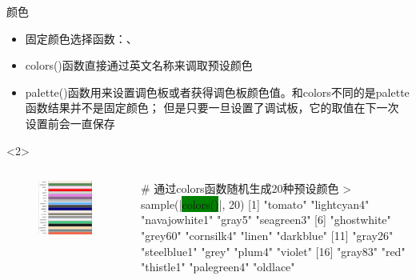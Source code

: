 \documentclass{beamerthemeMono}
\begin{document}
\begin{frame}[t,fragile]{\subsecname}{颜色}
\begin{itemize}
\item<1-> 固定颜色选择函数：、
\item<2-> colors()函数直接通过英文名称来调取预设颜色
\item<3-> palette()函数用来设置调色板或者获得调色板颜色值。和colors不同的是palette函数结果并不是固定颜色；
但是只要一旦设置了调试板，它的取值在下一次设置前会一直保存
\end{itemize}

\begin{overlayarea}{\textwidth}{\textheight}
\begin{onlyenv}<2>
  \begin{columns}
    \begin{column}{.4\textwidth}
\centering
      \begin{figure}
        \includegraphics[width=\columnwidth]{colors-bar.png} 
      \end{figure}
    \end{column}

    \begin{column}{.6\textwidth}
\centering
\begin{rcode}
# 通过colors函数随机生成20种预设颜色
> sample(|\colorbox{green}{colors()}|, 20)
 [1] "tomato"       "lightcyan4"   "navajowhite1" "gray5"        "seagreen3"   
 [6] "ghostwhite"   "grey60"       "cornsilk4"    "linen"        "darkblue"    
[11] "gray26"       "steelblue1"   "grey"         "plum4"        "violet"      
[16] "gray83"       "red"          "thistle1"     "palegreen4"   "oldlace" 
\end{rcode}
    \end{column}
  \end{columns}
\end{onlyenv}


\end{overlayarea}
\end{frame}
\end{document}
